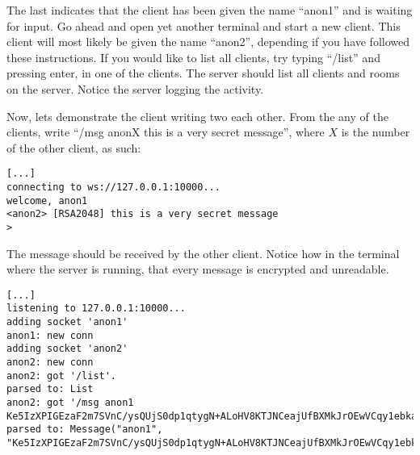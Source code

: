 The last indicates that the client has been given the name ``anon1''
and is waiting for input. Go ahead and open yet another terminal and
start a new client. This client will most likely be given the name
``anon2'', depending if you have followed these instructions. If you
would like to list all clients, try typing ``/list'' and pressing
enter, in one of the clients. The server should list all clients and
rooms on the server. Notice the server logging the activity.

Now, lets demonstrate the client writing two each other. From the
any of the clients, write ``/msg anonX this is a very secret
message'', where $X$ is the number of the other client, as such:
\begin{verbatim}
[...]
connecting to ws://127.0.0.1:10000...
welcome, anon1
<anon2> [RSA2048] this is a very secret message
>
\end{verbatim}

The message should be received by the other client. Notice how in the
terminal where the server is running, that every message is encrypted
and unreadable.
\begin{verbatim}
[...]
listening to 127.0.0.1:10000...
adding socket 'anon1'
anon1: new conn
adding socket 'anon2'
anon2: new conn
anon2: got '/list'.
parsed to: List
anon2: got '/msg anon1 Ke5IzXPIGEzaF2m7SVnC/ysQUjS0dp1qtygN+ALoHV8KTJNCeajUfBXMkJrOEwVCqy1ebka0wUaPgLW8IeXYIBEFEGLfUpAVymSll7EO2GGpXs5ibwDNqbbe+RgEM1UD3ZoIsF2H8rELwOkQT/C8uSbhYr15+7WWzJmvKqyF2ueoVx48D2a8ckqxbRTWf+qTuwxMU+eWNf/hMceowkVriSN0ngeDvEWUjkBpQdGm2EzVxrskL1dYnBkT7tvNRJJH7gmUDjtdIAaCAyus1AynPtSAhC0bbyg4cf3aaYo7+N5d3UoLc8R4aEsfrOmV1rbffMKqWSIdeiw4lW4Lnc8k6A=='.
parsed to: Message("anon1", "Ke5IzXPIGEzaF2m7SVnC/ysQUjS0dp1qtygN+ALoHV8KTJNCeajUfBXMkJrOEwVCqy1ebka0wUaPgLW8IeXYIBEFEGLfUpAVymSll7EO2GGpXs5ibwDNqbbe+RgEM1UD3ZoIsF2H8rELwOkQT/C8uSbhYr15+7WWzJmvKqyF2ueoVx48D2a8ckqxbRTWf+qTuwxMU+eWNf/hMceowkVriSN0ngeDvEWUjkBpQdGm2EzVxrskL1dYnBkT7tvNRJJH7gmUDjtdIAaCAyus1AynPtSAhC0bbyg4cf3aaYo7+N5d3UoLc8R4aEsfrOmV1rbffMKqWSIdeiw4lW4Lnc8k6A==")
\end{verbatim}
